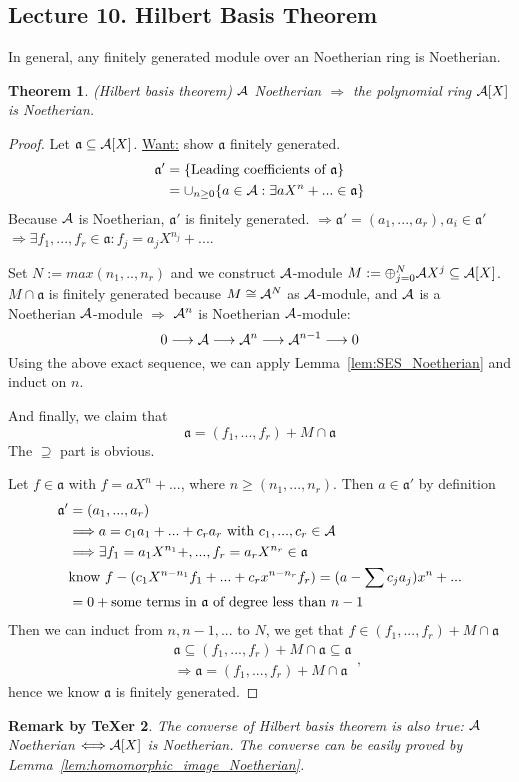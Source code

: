 \documentclass[11pt]{article}
\newtheorem{thm}{Theorem}[section]
\newtheorem{rmkt}[thm]{Remark by TeXer}
\newcommand{\sca}{{\mathfrak a}}
\newcommand{\cala}{{\cal A}}
\newcommand{\Lrta}{\Longrightarrow}
\newcommand{\lrta}{\longrightarrow}
\newcommand{\Llrta}{\Longleftrightarrow}
\begin{document}
\subsection{Lecture 10. Hilbert Basis Theorem}
In general, any finitely generated module over an Noetherian ring is Noetherian.

\begin{thm}\label{thm:Hilbert_Basis}(Hilbert basis theorem)
$\cala$ Noetherian $\Lrta $ the polynomial ring $\cala[X]$ is Noetherian.
\end{thm}

\begin{proof}
Let $\sca\subseteq \cala[X]$. \underline{Want:} show $\sca$ finitely generated. 
$$
\begin{aligned}
\sca' &=\{\text{Leading coefficients of $\sca$}\}\\
&= \cup_{n\geq 0}\{a\in\cala: \exists a X^n+...\in \sca\}
\end{aligned}
$$
Because $\cala$ is  Noetherian, $\sca'$ is finitely generated. $\Lrta\sca'=(a_1,...,a_r),a_i\in \sca'$ $\Lrta\exists f_1,...,f_r\in \sca: f_j=a_j X^{n_j}+...$.


Set $N:=max(n_1,..,n_r)$ and we construct $\cala$-module $M:=\oplus^N_{j=0}\cala X^j\subseteq \cala[X]$. $M\cap \sca$ is finitely generated because $M\cong \cala^N$ as $\cala$-module, and $\cala$ is a Noetherian $\cala$-module $\Lrta$ $\cala^n$ is Noetherian $\cala$-module:
$$
0\lrta \cala\lrta \cala^n\lrta \cala^{n-1}\lrta 0
$$
Using the above exact sequence, we can apply Lemma~\ref{lem:SES_Noetherian} and induct on $n$.

And finally, we claim that
$$
\sca=(f_1,...,f_r)+M\cap\sca
$$
The $\supseteq$ part is obvious.

Let $f\in \sca$ with $f=aX^n+...$, where $n\geq (n_1,...,n_r)$. Then $a\in\sca'$ by definition
$$
\begin{aligned}
\sca' &=(a_1,...,a_r)\\
&\Lrta a=c_1 a_1+...+c_r a_r\text{ with } c_1,...,c_r\in \cala\\
&\Lrta \exists f_1=a_1 X^{n_1}+,..., f_r=a_r X^{n_r}\in\sca\\
&\text{know } f-(c_1 X^{n-n_1}f_1+...+c_r x^{n-n_r}f_r)=(a-\sum c_j a_j)x^n+...\\
&=0+ \text{some terms in $\sca$ of degree less than $n-1$}
\end{aligned}
$$
Then we can induct from $n,n-1,...$ to $N$, we get that $f\in (f_1,...,f_r)+M\cap\sca$
$$
\begin{aligned}
&\sca\subseteq (f_1,...,f_r)+M\cap\sca\subseteq \sca\\
&\Lrta\sca=(f_1,...,f_r)+M\cap \sca
\end{aligned},
$$
hence we know $\sca$ is finitely generated.
\end{proof}
\begin{rmkt}
The converse of Hilbert basis theorem is also true: $\cala$ Noetherian $\Llrta\cala[X]$ is Noetherian. The converse can be easily proved by Lemma~\ref{lem:homomorphic_image_Noetherian}.
\end{rmkt}
\end{document}
